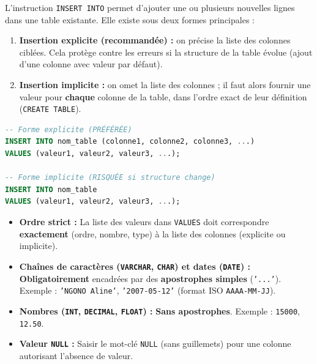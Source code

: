 \documentclass[11pt]{article}
\begin{document}
\begin{definition}
L'instruction \texttt{INSERT INTO} permet d'ajouter une ou plusieurs nouvelles lignes dans une table existante. Elle existe sous deux formes principales :
\begin{enumerate}
    \item \textbf{Insertion explicite (recommandée) :} on précise la liste des colonnes ciblées. Cela protège contre les erreurs si la structure de la table évolue (ajout d'une colonne avec valeur par défaut).
    \item \textbf{Insertion implicite :} on omet la liste des colonnes ; il faut alors fournir une valeur pour \textbf{chaque} colonne de la table, dans l'ordre exact de leur définition (\texttt{CREATE TABLE}).
\end{enumerate}
\end{definition}

\begin{propriete}
\begin{lstlisting}[language=SQL]
-- Forme explicite (PRÉFÉRÉE)
INSERT INTO nom_table (colonne1, colonne2, colonne3, ...)
VALUES (valeur1, valeur2, valeur3, ...);

-- Forme implicite (RISQUÉE si structure change)
INSERT INTO nom_table
VALUES (valeur1, valeur2, valeur3, ...);
\end{lstlisting}
\end{propriete}

\begin{aretenir}
\begin{itemize}
    \item \textbf{Ordre strict :} La liste des valeurs dans \texttt{VALUES} doit correspondre \textbf{exactement} (ordre, nombre, type) à la liste des colonnes (explicite ou implicite).
    \item \textbf{Chaînes de caractères (\texttt{VARCHAR}, \texttt{CHAR}) et dates (\texttt{DATE}) :} \textbf{Obligatoirement} encadrées par des \textbf{apostrophes simples} (\texttt{'...'}). Exemple : \texttt{'NGONO Aline'}, \texttt{'2007-05-12'} (format ISO \texttt{AAAA-MM-JJ}).
    \item \textbf{Nombres (\texttt{INT}, \texttt{DECIMAL}, \texttt{FLOAT}) :} \textbf{Sans apostrophes}. Exemple : \texttt{15000}, \texttt{12.50}.
    \item \textbf{Valeur \texttt{NULL} :} Saisir le mot-clé \texttt{NULL} (sans guillemets) pour une colonne autorisant l'absence de valeur.
\end{itemize}
\end{aretenir}
\end{document}
